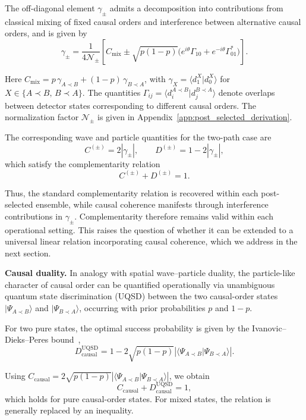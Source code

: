 \documentclass[aps,pra,reprint,superscriptaddress]{revtex4-2}
\begin{document}
The off-diagonal element $\gamma_\pm$ admits a decomposition into contributions from classical mixing of fixed causal orders and interference between alternative causal orders, and is given by
\begin{equation}
\gamma_\pm
=
\frac{1}{4\mathcal{N}_\pm}
\left[
C_{\mathrm{mix}}
\pm
\sqrt{p(1-p)}
\big(
e^{i\theta}\Gamma_{10}
+
e^{-i\theta}\Gamma_{01}^*
\big)
\right].
\end{equation}

Here $C_{\mathrm{mix}} = p\,\gamma_{A\prec B} + (1-p)\,\gamma_{B\prec A}$, with
$\gamma_X = \langle d_1^{X} | d_0^{X} \rangle$ for $X \in \{A\prec B,\, B\prec A\}$.
The quantities $\Gamma_{ij}=\langle d_i^{A\prec B}|d_j^{B\prec A}\rangle$ denote overlaps between detector states corresponding to different causal orders.
The normalization factor $\mathcal{N}_\pm$ is given in Appendix~\ref{app:post_selected_derivation}.

The corresponding wave and particle quantities for the two-path case are
\begin{equation}
C^{(\pm)} = 2|\gamma_\pm|,
\qquad
D^{(\pm)} = 1 - 2|\gamma_\pm|,
\end{equation}
which satisfy the complementarity relation
\begin{equation}
C^{(\pm)} + D^{(\pm)} = 1.
\end{equation}

Thus, the standard complementarity relation is recovered within each post-selected ensemble, while causal coherence manifests through interference contributions in $\gamma_\pm$. Complementarity therefore remains valid within each operational setting. This raises the question of whether it can be extended to a universal linear relation incorporating causal coherence, which we address in the next section.

\medskip
\noindent\textbf{Causal duality.}
In analogy with spatial wave--particle duality, the particle-like character of causal order can be quantified operationally via unambiguous quantum state discrimination (UQSD) between the two causal-order states $|\Psi_{A\prec B}\rangle$ and $|\Psi_{B\prec A}\rangle$, occurring with prior probabilities $p$ and $1-p$.

For two pure states, the optimal success probability is given by the Ivanovic--Dieks--Peres bound~\cite{Ivanovic1987,Dieks1988,Peres1988},
\[
D_{\mathrm{causal}}^{\mathrm{UQSD}} = 1 - 2\sqrt{p(1-p)} \left| \langle \Psi_{A\prec B}|\Psi_{B\prec A}\rangle \right|.
\]


Using $C_{\mathrm{causal}} = 2\sqrt{p(1-p)} \left| \langle \Psi_{A\prec B}|\Psi_{B\prec A}\rangle \right|$, we obtain
\begin{equation}
C_{\mathrm{causal}} + D_{\mathrm{causal}}^{\mathrm{UQSD}} = 1,
\end{equation}
which holds for pure causal-order states. For mixed states, the relation is generally replaced by an inequality.
\end{document}
